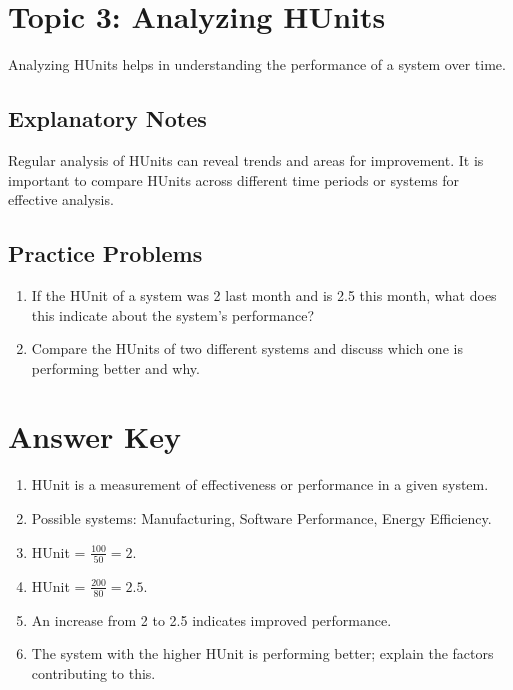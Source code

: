 \documentclass{article}
\begin{document}
\section*{Topic 3: Analyzing HUnits}
Analyzing HUnits helps in understanding the performance of a system over time.

\subsection*{Explanatory Notes}
Regular analysis of HUnits can reveal trends and areas for improvement. It is important to compare HUnits across different time periods or systems for effective analysis.

\subsection*{Practice Problems}
\begin{enumerate}[label=\arabic*.]
    \item If the HUnit of a system was 2 last month and is 2.5 this month, what does this indicate about the system's performance?
    \item Compare the HUnits of two different systems and discuss which one is performing better and why.
\end{enumerate}

\section*{Answer Key}
\begin{enumerate}[label=\arabic*.]
    \item HUnit is a measurement of effectiveness or performance in a given system.
    \item Possible systems: Manufacturing, Software Performance, Energy Efficiency.
    \item HUnit = \(\frac{100}{50} = 2\).
    \item HUnit = \(\frac{200}{80} = 2.5\).
    \item An increase from 2 to 2.5 indicates improved performance.
    \item The system with the higher HUnit is performing better; explain the factors contributing to this.
\end{enumerate}
\end{document}
